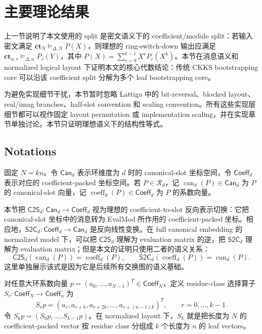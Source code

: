 \documentclass[UTF8,11pt]{article}
\newcommand{\CtwoS}{\mathsf{C2S}}
\newcommand{\StwoC}{\mathsf{S2C}}
\newcommand{\ct}{\mathbf{ct}}
\theoremstyle{definition}
\theoremstyle{plain}
\begin{document}
\section{主要理论结果}
\label{sec:main-theoretical-results}

上一节说明了本文使用的 split 是密文语义下的 coefficient/module split：若输入密文满足 \(\ct_N\vDash_{\Delta,N}P(X)\)，则理想的 ring-switch-down 输出应满足 \(\ct_{n,r}\vDash_{\Delta,n}P_r(Y)\)，其中 \(P(X)=\sum_{r=0}^{k-1}X^rP_r(X^k)\)。本节在消息语义和 normalized logical layout 下证明本文的核心代数结论：传统 CKKS bootstrapping core 可以沿该 coefficient split 分解为多个 leaf bootstrapping core。

为避免实现细节干扰，本节暂时忽略 Lattigo 中的 bit-reversal、blocked layout、real/imag branches、half-slot convention 和 scaling convention。所有这些实现层细节都可以视作固定 layout permutation 或 implementation scaling，并在实现章节单独讨论。本节只证明理想语义下的结构性等式。

\subsection{Notations}
\label{subsec:theory-notations}

固定 \(N=kn\)。令 \(\mathsf{Can}_d\) 表示环维度为 \(d\) 时的 canonical-slot 坐标空间，令 \(\mathsf{Coeff}_d\) 表示对应的 coefficient-packed 坐标空间。若 \(P\in\mathcal R_d\)，记 \(\operatorname{can}_d(P)\in\mathsf{Can}_d\) 为 \(P\) 的 canonical-slot 向量，记 \(\operatorname{coeff}_d(P)\in\mathsf{Coeff}_d\) 为 \(P\) 的系数向量。

本节把 \(\CtwoS_d:\mathsf{Can}_d\to\mathsf{Coeff}_d\) 视为理想的 coefficient-to-slot 反向表示切换：它把 canonical-slot 坐标中的消息转为 EvalMod 所作用的 coefficient-packed 坐标。相应地，\(\StwoC_d:\mathsf{Coeff}_d\to\mathsf{Can}_d\) 是反向线性变换。在 full canonical embedding 的 normalized model 下，可以把 \(\CtwoS_d\) 理解为 evaluation matrix 的逆，把 \(\StwoC_d\) 理解为 evaluation matrix；但是本文的证明只使用二者的语义关系：
\[
\CtwoS_d(\operatorname{can}_d(P))=\operatorname{coeff}_d(P),
\qquad
\StwoC_d(\operatorname{coeff}_d(P))=\operatorname{can}_d(P).
\]
这里单独展示该式是因为它是后续所有交换图的语义基础。

对任意大环系数向量 \(p=(a_0,\ldots,a_{N-1})^T\in\mathsf{Coeff}_N\)，定义 residue-class 选择算子 \(S_r:\mathsf{Coeff}_N\to\mathsf{Coeff}_n\) 为
\[
S_rp=(a_r,a_{r+k},a_{r+2k},\ldots,a_{r+(n-1)k})^T,
\qquad r=0,\ldots,k-1.
\]
令 \(S_kp=(S_0p,\ldots,S_{k-1}p)\)。在 normalized layout 下，\(S_k\) 就是把长度为 \(N\) 的 coefficient-packed vector 按 residue class 分组成 \(k\) 个长度为 \(n\) 的 leaf vectors。
\end{document}
